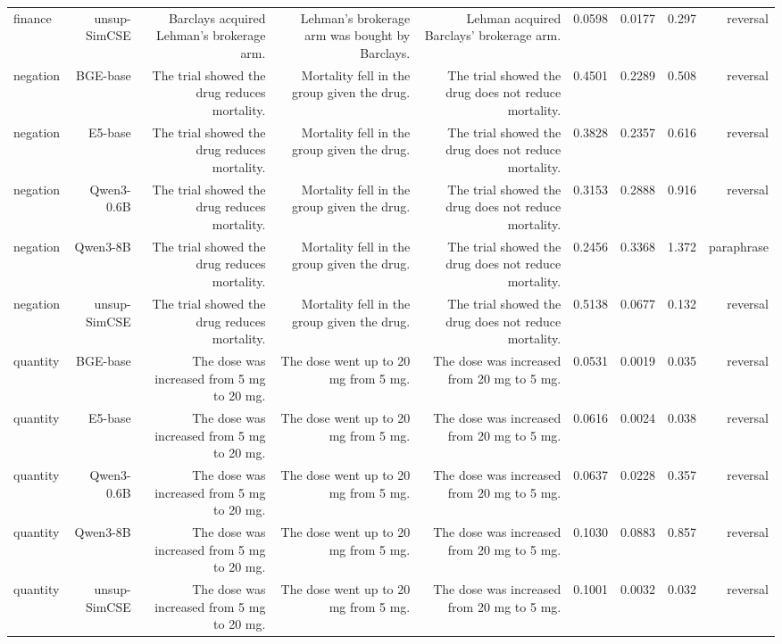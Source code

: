 \begin{table}[t]
\begin{tabular}{lrrrrrrrr}
finance & unsup-SimCSE & Barclays acquired Lehman's brokerage arm. & Lehman's brokerage arm was bought by Barclays. & Lehman acquired Barclays' brokerage arm. & 0.0598 & 0.0177 & 0.297 & reversal \\
negation & BGE-base & The trial showed the drug reduces mortality. & Mortality fell in the group given the drug. & The trial showed the drug does not reduce mortality. & 0.4501 & 0.2289 & 0.508 & reversal \\
negation & E5-base & The trial showed the drug reduces mortality. & Mortality fell in the group given the drug. & The trial showed the drug does not reduce mortality. & 0.3828 & 0.2357 & 0.616 & reversal \\
negation & Qwen3-0.6B & The trial showed the drug reduces mortality. & Mortality fell in the group given the drug. & The trial showed the drug does not reduce mortality. & 0.3153 & 0.2888 & 0.916 & reversal \\
negation & Qwen3-8B & The trial showed the drug reduces mortality. & Mortality fell in the group given the drug. & The trial showed the drug does not reduce mortality. & 0.2456 & 0.3368 & 1.372 & paraphrase \\
negation & unsup-SimCSE & The trial showed the drug reduces mortality. & Mortality fell in the group given the drug. & The trial showed the drug does not reduce mortality. & 0.5138 & 0.0677 & 0.132 & reversal \\
quantity & BGE-base & The dose was increased from 5 mg to 20 mg. & The dose went up to 20 mg from 5 mg. & The dose was increased from 20 mg to 5 mg. & 0.0531 & 0.0019 & 0.035 & reversal \\
quantity & E5-base & The dose was increased from 5 mg to 20 mg. & The dose went up to 20 mg from 5 mg. & The dose was increased from 20 mg to 5 mg. & 0.0616 & 0.0024 & 0.038 & reversal \\
quantity & Qwen3-0.6B & The dose was increased from 5 mg to 20 mg. & The dose went up to 20 mg from 5 mg. & The dose was increased from 20 mg to 5 mg. & 0.0637 & 0.0228 & 0.357 & reversal \\
quantity & Qwen3-8B & The dose was increased from 5 mg to 20 mg. & The dose went up to 20 mg from 5 mg. & The dose was increased from 20 mg to 5 mg. & 0.1030 & 0.0883 & 0.857 & reversal \\
quantity & unsup-SimCSE & The dose was increased from 5 mg to 20 mg. & The dose went up to 20 mg from 5 mg. & The dose was increased from 20 mg to 5 mg. & 0.1001 & 0.0032 & 0.032 & reversal \\
\bottomrule
\end{tabular}
\end{table}
